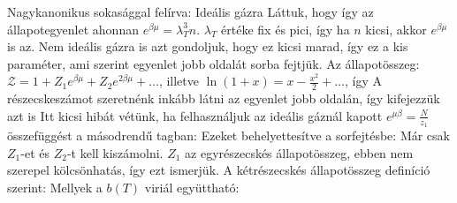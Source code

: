    Nagykanonikus sokasággal felírva:
   Ideális gázra Láttuk, hogy 
   így az állapotegyenlet
   ahonnan $e^{\beta\mu}=\lambda_T^3 n$. $\lambda_T$ értéke fix és pici, így ha $n$ kicsi, akkor $e^{\beta\mu}$ is az.
   Nem ideális gázra is azt gondoljuk, hogy ez kicsi marad, így ez a kis paraméter, ami szerint  egyenlet jobb oldalát sorba fejtjük.
   Az állapotösszeg: $\mathcal{Z}=1+Z_1 e^{\beta\mu}+Z_2 e^{2\beta\mu}+\dots$, illetve $\ln(1+x)=x-\frac{x^2}{2}+\dots$, így
   A részecskeszámot szeretnénk inkább látni az egyenlet jobb oldalán, így kifejezzük azt is
   Itt kicsi hibát vétünk, ha felhasználjuk az ideális gáznál kapott $e^{\mu\beta}=\frac{N}{z_1}$ összefüggést a másodrendű tagban:
   Ezeket behelyettesítve a sorfejtésbe:
   Már csak $Z_1$-et és $Z_2$-t kell kiszámolni. $Z_1$ az egyrészecskés állapotösszeg, ebben nem szerepel kölcsönhatás, így ezt ismerjük.
   A kétrészecskés állapotösszeg definíció szerint:
   Mellyek a $b(T)$ viriál együttható:
   

